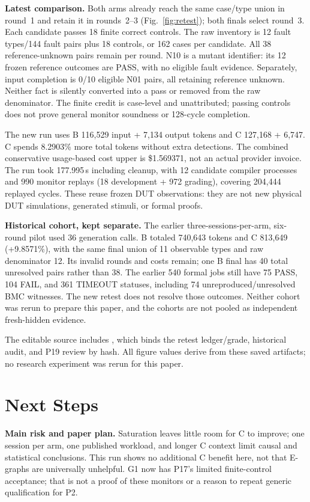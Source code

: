 \documentclass[conference,10pt,letterpaper]{IEEEtran}
\begin{document}
\textbf{Latest comparison.} Both arms already reach the same case/type union in
round~1 and retain it in rounds~2--3 (Fig.~\ref{fig:retest}); both finals select
round~3. Each candidate passes 18 finite correct controls. The raw inventory is
12 fault types/144 fault pairs plus 18 controls, or 162 cases per candidate.
All 38 reference-unknown pairs remain per round. N10 is a mutant identifier:
its 12 frozen reference outcomes are PASS, with no eligible fault evidence.
Separately, input completion is 0/10 eligible N01 pairs, all retaining reference
unknown. Neither fact is silently converted into a pass or removed from the
raw denominator. The finite credit is case-level and unattributed; passing
controls does not prove general monitor soundness or 128-cycle completion.

The new run uses B 116,529 input + 7,134 output tokens and C 127,168 + 6,747.
C spends 8.2903\% more total tokens without extra detections. The combined
conservative usage-based cost upper is \$1.569371, not an actual
provider invoice. The run took 177.995\,s including cleanup, with 12 candidate
compiler processes and 990 monitor replays (18 development + 972 grading),
covering 204,444 replayed cycles. These reuse frozen DUT observations: they are
not new physical DUT simulations, generated stimuli, or formal proofs.

\textbf{Historical cohort, kept separate.} The earlier three-sessions-per-arm,
six-round pilot used 36 generation calls. B totaled 740,643 tokens and C 813,649
(+9.8571\%), with the same final union of 11 observable types and raw denominator
12. Its invalid rounds and costs remain; one B final has 40 total unresolved
pairs rather than 38. The earlier 540 formal jobs still have 75 PASS, 104 FAIL,
and 361 TIMEOUT statuses, including 74 unreproduced/unresolved BMC witnesses.
The new retest does not resolve those outcomes. Neither cohort was rerun to
prepare this paper, and the cohorts are not pooled as independent fresh-hidden
evidence.

The editable source includes , which binds the retest
ledger/grade, historical audit, and P19 review by hash. All figure values derive
from these saved artifacts; no research experiment was rerun for this paper.

\section{Next Steps}
\textbf{Main risk and paper plan.} Saturation leaves little room for C to improve;
one session per arm, one published workload, and longer C context limit causal
and statistical conclusions. This run shows no additional C benefit here, not
that E-graphs are universally unhelpful. G1 now has P17's limited finite-control
acceptance; that is not a proof of these monitors or a reason to repeat generic
qualification for P2.
\end{document}
